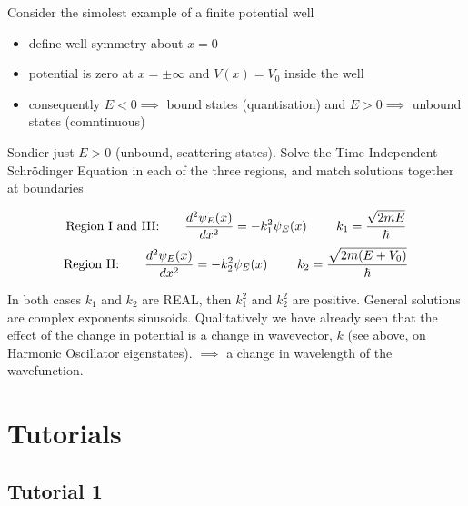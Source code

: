 \documentclass[english, 11pt]{article}
\begin{document}
      Consider the simolest example of a finite potential well

      \begin{itemize}
        \item define well symmetry about $x = 0$
        \item potential is zero at $x = \pm \infty$ and $V(x) = V_0$ inside the well
        \item consequently $E<0 \implies$ bound states (quantisation) and $E>0 \implies$ unbound states (comntinuous)
      \end{itemize}

      Sondier just $E > 0$ (unbound, scattering states). Solve the Time Independent Schrödinger Equation in each of the three regions, and match solutions together at boundaries

      \[ \mbox{Region I and III: } \ \ \ \ \ \f{d^2\psi_E(x)}{dx^2} = -k_1^2\psi_E(x) \ \ \ \ \ \ \ k_1 = \f{\sqrt{2mE}}{\hbar} \]
      \[ \mbox{Region II: } \ \ \ \ \ \f{d^2\psi_E(x)}{dx^2} = -k_2^2\psi_E(x) \ \ \ \ \ \ \ k_2 = \f{\sqrt{2m(E+V_0)}}{\hbar} \]

      In both cases $k_1$ and $k_2$ are REAL, then $k_1^2$ and $k_2^2$ are positive. General solutions are complex exponents sinusoids. Qualitatively we have already seen that the effect of the change in potential is a change in wavevector, $k$ (see above, on Harmonic Oscillator eigenstates). $\implies$ a change in wavelength of the wavefunction.








   \section{Tutorials}

     \subsection{Tutorial 1}
\end{document}
